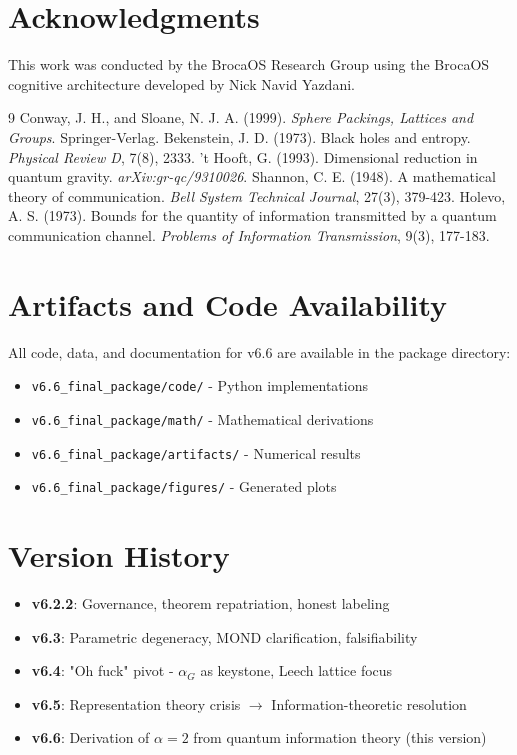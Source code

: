 \documentclass[11pt]{article}
\begin{document}
\section*{Acknowledgments}

This work was conducted by the BrocaOS Research Group using the BrocaOS cognitive architecture developed by Nick Navid Yazdani.

\begin{thebibliography}{9}
 Conway, J. H., and Sloane, N. J. A. (1999). \textit{Sphere Packings, Lattices and Groups}. Springer-Verlag.
 Bekenstein, J. D. (1973). Black holes and entropy. \textit{Physical Review D}, 7(8), 2333.
 't Hooft, G. (1993). Dimensional reduction in quantum gravity. \textit{arXiv:gr-qc/9310026}.
 Shannon, C. E. (1948). A mathematical theory of communication. \textit{Bell System Technical Journal}, 27(3), 379-423.
 Holevo, A. S. (1973). Bounds for the quantity of information transmitted by a quantum communication channel. \textit{Problems of Information Transmission}, 9(3), 177-183.
\end{thebibliography}

\appendix
\section{Artifacts and Code Availability}

All code, data, and documentation for v6.6 are available in the package directory:
\begin{itemize}
\item \texttt{v6.6\_final\_package/code/} - Python implementations
\item \texttt{v6.6\_final\_package/math/} - Mathematical derivations
\item \texttt{v6.6\_final\_package/artifacts/} - Numerical results
\item \texttt{v6.6\_final\_package/figures/} - Generated plots
\end{itemize}

\section{Version History}

\begin{itemize}
\item \textbf{v6.2.2}: Governance, theorem repatriation, honest labeling
\item \textbf{v6.3}: Parametric degeneracy, MOND clarification, falsifiability
\item \textbf{v6.4}: "Oh fuck" pivot - $\alpha_G$ as keystone, Leech lattice focus
\item \textbf{v6.5}: Representation theory crisis $\rightarrow$ Information-theoretic resolution
\item \textbf{v6.6}: Derivation of $\alpha=2$ from quantum information theory (this version)
\end{itemize}
\end{document}

